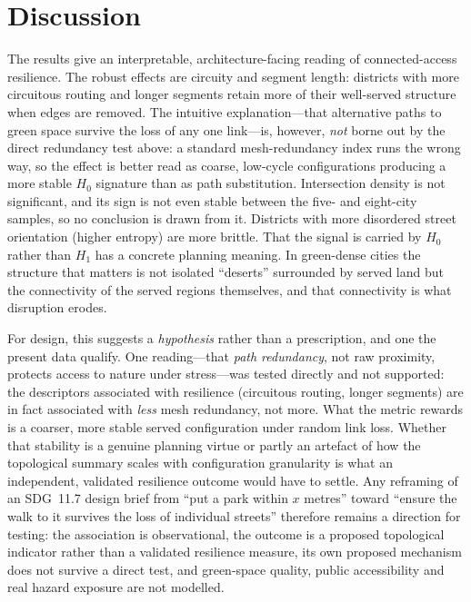 \section{Discussion}
The results give an interpretable, architecture-facing reading of connected-access
resilience.
The robust effects are circuity and segment length: districts with more circuitous
routing and longer segments retain more of their well-served structure when edges
are removed. The intuitive explanation---that alternative paths to green space survive
the loss of any one link---is, however, \emph{not} borne out by the direct redundancy
test above: a standard mesh-redundancy index runs the wrong way, so the effect is
better read as coarse, low-cycle configurations producing a more stable $H_0$
signature than as path substitution. Intersection density is not significant, and its
sign is not even stable
between the five- and eight-city samples, so no conclusion is drawn from it. Districts
with more disordered street orientation (higher entropy) are more brittle. That the signal
is carried by $H_0$ rather than $H_1$ has a concrete planning meaning. In
green-dense cities the structure that matters is not isolated ``deserts''
surrounded by served land but the connectivity of the served regions themselves,
and that connectivity is what disruption erodes.

For design, this suggests a \emph{hypothesis} rather than a prescription, and one the
present data qualify. One reading---that \emph{path redundancy}, not raw
proximity, protects access to nature under stress---was tested directly and not
supported: the descriptors associated with resilience (circuitous routing, longer
segments) are in fact associated with \emph{less} mesh redundancy, not more. What the
metric rewards is a coarser, more stable served configuration under random link loss.
Whether that stability is a genuine planning virtue or partly an artefact of how the
topological summary scales with configuration granularity is what an
independent, validated resilience outcome would have to settle. Any reframing of an
SDG~11.7 design brief from ``put a park within $x$ metres'' toward ``ensure the walk
to it survives the loss of individual streets'' therefore remains a direction for
testing: the association is observational, the outcome is a proposed topological
indicator rather than a validated resilience measure, its own proposed mechanism does
not survive a direct test, and green-space quality, public accessibility and real
hazard exposure are not modelled.

